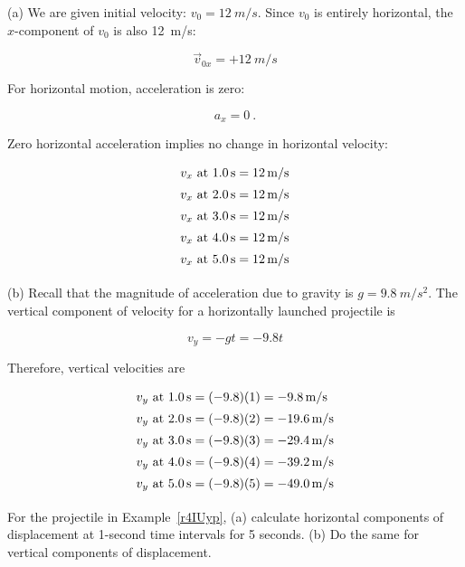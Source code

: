 \documentclass[main-physics.tex]{subfiles}
\begin{document}
\Solution (a) We are given initial velocity: $v_0 = \SI{12}{m/s}$. Since $v_0$ is entirely horizontal, the $x$-component of $v_0$ is also \SI{12}{m/s}:

\begin{equation*}
    \vec{v}_{0x} = +\SI{12}{m/s}
\end{equation*}

For horizontal motion, acceleration is zero:

\begin{equation*}
    a_x = 0\ .
\end{equation*}

Zero horizontal acceleration implies no change in horizontal velocity:
\vspace{-1em}

\begin{align*}
    v_x \text{ at \SI{1.0}{s}} &= \SI{12}{m/s}\\[0.5ex]
    v_x \text{ at \SI{2.0}{s}} &= \SI{12}{m/s}\\[0.5ex]
    v_x \text{ at \SI{3.0}{s}} &= \SI{12}{m/s}\\[0.5ex]
    v_x \text{ at \SI{4.0}{s}} &= \SI{12}{m/s}\\[0.5ex]
    v_x \text{ at \SI{5.0}{s}} &= \SI{12}{m/s}\\[0.5ex]
\end{align*}

(b) Recall that the magnitude of acceleration due to gravity is $g = \SI{9.8}{m/s^2}$. The vertical component of velocity for a horizontally launched projectile is 

\begin{equation*} 
    v_y = -g t = -9.8 t
\end{equation*}

Therefore, vertical velocities are

\begin{align*}
    v_y \text{ at \SI{1.0}{s}} &= (-9.8)(1) = \SI{-9.8}{m/s}\\[0.5ex]
    v_y \text{ at \SI{2.0}{s}} &= (-9.8)(2) = \SI{-19.6}{m/s}\\[0.5ex]
    v_y \text{ at \SI{3.0}{s}} &= (-9.8)(3) = \SI{-29.4}{m/s}\\[0.5ex]
    v_y \text{ at \SI{4.0}{s}} &= (-9.8)(4) = \SI{-39.2}{m/s}\\[0.5ex]
    v_y \text{ at \SI{5.0}{s}} &= (-9.8)(5) = \SI{-49.0}{m/s}\\[0.5ex]
\end{align*}

\begin{example}
    For the projectile in Example~\ref{r4IUyp}, (a) calculate horizontal components of displacement at 1-second time intervals for 5 seconds. (b) Do the same for vertical components of displacement.
\end{example}
\end{document}
